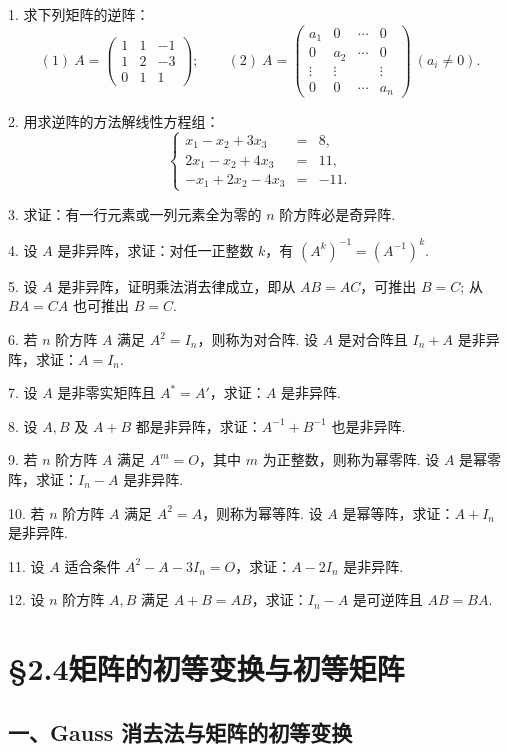 \documentclass[UTF8,12pt,a4paper,fontset=fandol]{ctexart}
\begin{document}
1. 求下列矩阵的逆阵：
\[
(1)\ A=\left(\begin{array}{ccc}
1 & 1 & -1\\
1 & 2 & -3\\
0 & 1 & 1
\end{array}\right);
\qquad
(2)\ A=\left(\begin{array}{cccc}
a_1 & 0 & \cdots & 0\\
0 & a_2 & \cdots & 0\\
\vdots & \vdots & & \vdots\\
0 & 0 & \cdots & a_n
\end{array}\right)\ (a_i\ne 0).
\]

2. 用求逆阵的方法解线性方程组：
\[
\left\{\begin{array}{rcl}
x_1-x_2+3x_3&=&8,\\
2x_1-x_2+4x_3&=&11,\\
-x_1+2x_2-4x_3&=&-11.
\end{array}\right.
\]

3. 求证：有一行元素或一列元素全为零的 $n$ 阶方阵必是奇异阵.

4. 设 $A$ 是非异阵，求证：对任一正整数 $k$，有 $(A^k)^{-1}=(A^{-1})^k$.

5. 设 $A$ 是非异阵，证明乘法消去律成立，即从 $AB=AC$，可推出 $B=C$; 从 $BA=CA$ 也可推出 $B=C$.

6. 若 $n$ 阶方阵 $A$ 满足 $A^2=I_n$，则称为对合阵. 设 $A$ 是对合阵且 $I_n+A$ 是非异阵，求证：$A=I_n$.

7. 设 $A$ 是非零实矩阵且 $A^*=A'$，求证：$A$ 是非异阵.

8. 设 $A,B$ 及 $A+B$ 都是非异阵，求证：$A^{-1}+B^{-1}$ 也是非异阵.

9. 若 $n$ 阶方阵 $A$ 满足 $A^m=O$，其中 $m$ 为正整数，则称为幂零阵. 设 $A$ 是幂零阵，求证：$I_n-A$ 是非异阵.

10. 若 $n$ 阶方阵 $A$ 满足 $A^2=A$，则称为幂等阵. 设 $A$ 是幂等阵，求证：$A+I_n$ 是非异阵.

11. 设 $A$ 适合条件 $A^2-A-3I_n=O$，求证：$A-2I_n$ 是非异阵.

12. 设 $n$ 阶方阵 $A,B$ 满足 $A+B=AB$，求证：$I_n-A$ 是可逆阵且 $AB=BA$.

\section*{§2.4\quad 矩阵的初等变换与初等矩阵}

\subsection*{一、Gauss 消去法与矩阵的初等变换}
\end{document}
